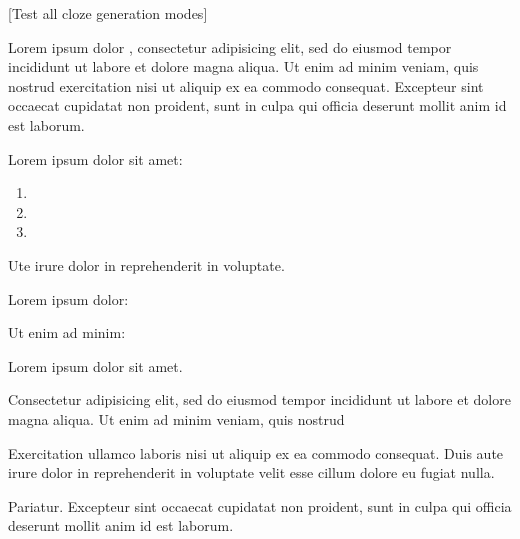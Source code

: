 \documentclass{article}
\begin{document}
[Test all cloze generation modes]


Lorem ipsum dolor , consectetur adipisicing elit, sed do
eiusmod tempor incididunt ut labore et dolore magna aliqua. Ut enim ad
minim veniam, quis nostrud exercitation  nisi ut
aliquip ex ea commodo consequat.  Excepteur sint occaecat cupidatat non proident, sunt in culpa
qui officia deserunt mollit anim id est laborum.


Lorem ipsum dolor sit amet:

\begin{enumerate}
\item {}
\item {}
\item {}
\end{enumerate}

Ute irure dolor in reprehenderit in voluptate.


Lorem ipsum dolor: 

Ut enim ad minim: 


\begin{clozepar}
Lorem ipsum dolor sit amet.
\end{clozepar}

Consectetur adipisicing elit, sed do eiusmod tempor incididunt ut labore
et dolore magna aliqua. Ut enim ad minim veniam, quis nostrud

\begin{clozepar}
Exercitation ullamco laboris nisi ut aliquip ex ea commodo consequat.
Duis aute irure dolor in reprehenderit in voluptate velit esse cillum
dolore eu fugiat nulla.
\end{clozepar}

Pariatur. Excepteur sint
occaecat cupidatat non proident, sunt in culpa qui officia deserunt
mollit anim id est laborum.
\end{document}
